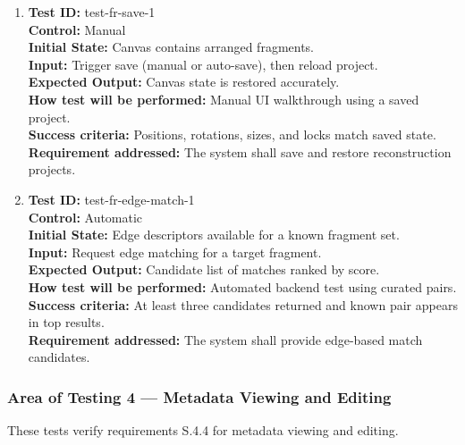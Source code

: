 \documentclass[12pt, titlepage]{article}
\begin{document}
\begin{enumerate}
    \item
    \textbf{Test ID:} test-fr-save-1\\
    \textbf{Control:} Manual\\
    \textbf{Initial State:} Canvas contains arranged fragments.\\
    \textbf{Input:} Trigger save (manual or auto-save), then reload project.\\
    \textbf{Expected Output:} Canvas state is restored accurately.\\
    \textbf{How test will be performed:} Manual UI walkthrough using a saved project.\\
    \textbf{Success criteria:} Positions, rotations, sizes, and locks match saved state.\\
    \textbf{Requirement addressed:} The system shall save and restore reconstruction projects.\\

    \item
    \textbf{Test ID:} test-fr-edge-match-1\\
    \textbf{Control:} Automatic\\
    \textbf{Initial State:} Edge descriptors available for a known fragment set.\\
    \textbf{Input:} Request edge matching for a target fragment.\\
    \textbf{Expected Output:} Candidate list of matches ranked by score.\\
    \textbf{How test will be performed:} Automated backend test using curated pairs.\\
    \textbf{Success criteria:} At least three candidates returned and known pair appears in top results.\\
    \textbf{Requirement addressed:} The system shall provide edge-based match candidates.\\
\end{enumerate}

\subsubsection{Area of Testing 4 — Metadata Viewing and Editing}

These tests verify requirements S.4.4 for metadata viewing and editing.
\end{document}
